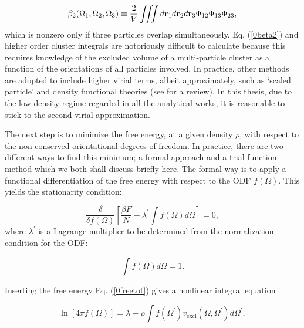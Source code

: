 {\begin{equation}
\beta_{2}(\Omega_{1},\Omega_{2},\Omega_{3})\equiv \frac{2}{V}\iiint
d{\bf r}_{1}d{\bf r}_{2}d{\bf r}_{3} \Phi_{12}\Phi_{13}\Phi_{23}, \label{0beta2}
\end{equation}
which is nonzero only if three particles overlap simultaneously. Eq. (\ref{0beta2}) and higher order cluster integrals are notoriously difficult to calculate because this requires knowledge of the excluded volume of a multi-particle cluster as a function of the orientations of all particles involved. In practice, other methods are adopted to include higher virial terms, albeit approximately, such as `scaled particle' \cite{Cotterspt,Cotter} and density functional theories (see \cite{Vroege92,DFTspecialJPCM} for a review). In this thesis, due to the low density regime regarded in all the analytical works, it is reasonable to stick to the second virial approximation.

The next step is to minimize the free energy, at a given density $\rho$, with respect to the non-conserved orientational degrees of freedom. In practice, there are two different ways to find this minimum; a formal approach and a trial function method which we both shall discuss briefly here. The formal way  is to apply a functional differentiation of the free energy with respect to the ODF $f(\Omega)$. This yields the stationarity condition:

\begin{equation}
\frac{\delta}{\delta f(\Omega)} \left[\frac{\beta F}{N}-\lambda^{\prime} \int f(\Omega)d \Omega \right]=0,
\label{0statcond}
\end{equation}
where $\lambda^{\prime}$ is a Lagrange multiplier to be determined from the normalization condition for the ODF:

\begin{equation}
\int f(\Omega)d\Omega =1.
\end{equation}

Inserting the free energy Eq. (\ref{0freetot}) gives a nonlinear integral equation

\begin{equation}
\ln[4\pi f(\Omega)]=\lambda - \rho \int f(\Omega^{\prime})v_{\text{excl}}(\Omega,\Omega^{\prime})
d\Omega^{\prime}, \label{0inteq}
\end{equation}

}
